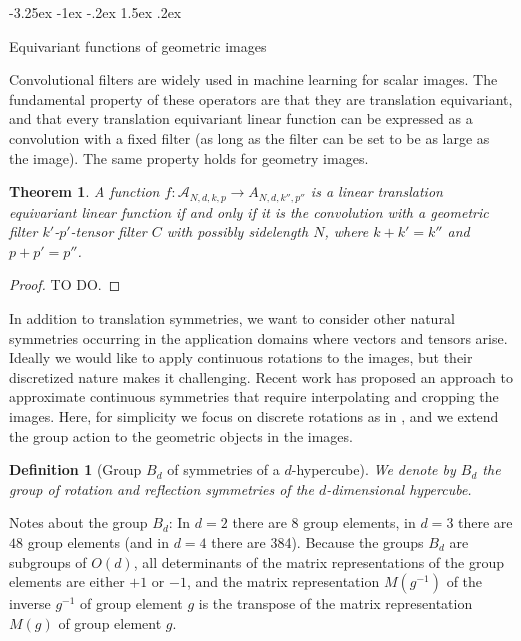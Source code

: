 \documentclass{article}
\makeatletter
\theoremstyle{plain}
\newtheorem{definition}{Definition}
\newtheorem{theorem}{Theorem}
\renewcommand\section{\@startsection {section}{1}{\z@}%
  {-3.25ex \@plus -1ex \@minus -.2ex}%
  {1.5ex \@plus .2ex}%
  {\raggedright\normalfont\large\bfseries}}%
\makeatother
\begin{document}
\section{Equivariant functions of geometric images}\label{sec:equivariant}

Convolutional filters are widely used in machine learning for scalar images. The fundamental property of these operators are that they are translation equivariant, and that every translation equivariant linear function can be expressed as a convolution with a fixed filter (as long as the filter can be set to be as large as the image). The same property holds for geometry images.

\begin{theorem}
A function $f:\mathcal A_{N,d,k,p}\to A_{N,d, k'', p''}$ is a linear translation equivariant linear function if and only if it is the convolution with a geometric filter $k'$-$p'$-tensor filter $C$ with possibly sidelength $N$, where $k+k'=k''$ and $p+p'=p''$.
\end{theorem}

\begin{proof}
TO DO.
\end{proof}

In addition to translation symmetries, we want to consider other natural symmetries occurring in the application domains where vectors and tensors arise. Ideally we would like to apply continuous rotations to the images, but their discretized nature makes it challenging. Recent work has proposed an approach to approximate continuous symmetries \cite{} that require interpolating and cropping the images. Here, for simplicity we focus on discrete rotations as in \cite{}, and we extend the group action to the geometric objects in the images.



\begin{definition}[Group $B_d$ of symmetries of a $d$-hypercube]
We denote by $B_d$ the group of rotation and reflection symmetries of the $d$-dimensional hypercube.
\end{definition}

Notes about the group $B_d$: In $d=2$ there are $8$ group elements, in $d=3$ there are $48$ group elements (and in $d=4$ there are 384). Because the groups $B_d$ are subgroups of $O(d)$, all determinants of the matrix representations of the group elements are either $+1$ or $-1$, and the matrix representation $M(g^{-1})$ of the inverse $g^{-1}$ of group element $g$ is the transpose of the matrix representation $M(g)$ of group element $g$.
\end{document}
